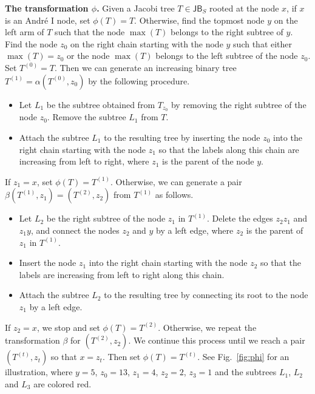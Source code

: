 \documentclass[12pt]{article}
\numberwithin{equation}{section}
\theoremstyle{plain}
\def\JB{\mathsf{JB}}
\begin{document}
    {\bf The transformation $\phi$.} Given a Jacobi tree $T\in \JB_S$ rooted at the node $x$, if $x$ is an     Andr\'e $\mathrm{I}$ node, set $\phi(T)=T$. Otherwise,  find the topmost node $y$ on the left arm of $T$  such that the node $\max(T)$  belongs to the right subtree of  $y$.      
    Find the node $z_0$ on the right chain starting with the node $y$ such that either $\max(T)=z_0$ or  the node $\max(T)$ belongs to the left subtree of the node $z_0$.  Set $T^{(0)}=T$. 
      Then we can generate an increasing binary tree $T^{(1)}=\alpha(T^{(0)}, z_0)$  
    	 by the following procedure.
    	     \begin{itemize}
    	     	\item  Let $L_1$ be the subtree obtained from $T_{z_0}$ by removing the right subtree of the node $z_0$.  Remove  the subtree $L_1$ from $T$. 
    	     	\item Attach the subtree $L_1$  to the resulting tree  by inserting the node $z_0$ into the right chain starting with the node $z_1$ so that the labels along this chain are increasing from left to right, where $z_1$ is the parent of the node $y$.  
    	     	\end{itemize}
    	If $z_1=x$, set $\phi(T)=T^{(1)}$.  Otherwise,   we can generate a pair $\beta(T^{(1)}, z_1)=(T^{(2)}, z_2)$ from $T^{(1)}$ as follows.
    	\begin{itemize}
    		\item  Let $L_2$ be the right  subtree  of   the node $z_1$ in $T^{(1)}$.
    		 Delete  the edges $z_2z_1$ and $z_1y$,  and connect the nodes $z_2$ and $y$ by a left edge, where $z_2$ is the parent of $z_1$ in $T^{(1)}$. 
  \item  Insert the node $z_1$ into the right chain starting with the node $z_2$ so that the labels are increasing from left to right along this chain.  
    		\item  Attach the subtree  $L_2$  to the resulting tree by connecting its root to the node $z_1$ by a left edge.
    		\end{itemize}
    	If $z_2=x$, we stop and set $\phi(T)=T^{(2)}$. Otherwise, we repeat the transformation $\beta$ for $(T^{(2)}, z_2)$. We continue this process until we reach a pair  $(T^{(t)}, z_t)$ so that  $x=z_t$. Then set $\phi(T)=T^{(t)}$.  See Fig.~\ref{fig:phi} for an illustration, where $y=5$, $z_0=13$, $z_1=4$, $z_2=2$, $z_3=1$ and  the subtrees $L_1$, $L_2$ and $L_3$ are colored   red.
    	
    	
    	
\end{document}
